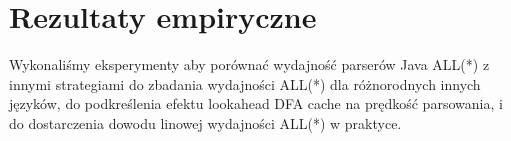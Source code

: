 ﻿\section{Rezultaty empiryczne}
Wykonaliśmy eksperymenty aby porównać wydajność parserów Java ALL(*) z
innymi strategiami do zbadania wydajności ALL(*) dla różnorodnych innych języków,
do podkreślenia efektu lookahead DFA cache na prędkość parsowania, i do dostarczenia
dowodu linowej wydajności ALL(*) w praktyce.
